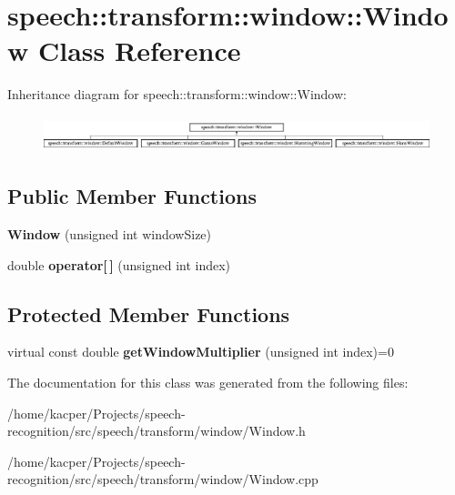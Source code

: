 \hypertarget{classspeech_1_1transform_1_1window_1_1Window}{\section{speech\+:\+:transform\+:\+:window\+:\+:Window Class Reference}
\label{classspeech_1_1transform_1_1window_1_1Window}
}
Inheritance diagram for speech\+:\+:transform\+:\+:window\+:\+:Window\+:\begin{figure}[H]
\begin{center}
\leavevmode
\includegraphics[height=1.040892cm]{classspeech_1_1transform_1_1window_1_1Window}
\end{center}
\end{figure}
\subsection*{Public Member Functions}
\begin{DoxyCompactItemize}
\item 
\hypertarget{classspeech_1_1transform_1_1window_1_1Window_a6c33bea81b0700d6d95d880ec985404a}{{\bfseries Window} (unsigned int window\+Size)}\label{classspeech_1_1transform_1_1window_1_1Window_a6c33bea81b0700d6d95d880ec985404a}

\item 
\hypertarget{classspeech_1_1transform_1_1window_1_1Window_a3e2b01bd3fe3722790b2c7023dfe0417}{double {\bfseries operator\mbox{[}$\,$\mbox{]}} (unsigned int index)}\label{classspeech_1_1transform_1_1window_1_1Window_a3e2b01bd3fe3722790b2c7023dfe0417}

\end{DoxyCompactItemize}
\subsection*{Protected Member Functions}
\begin{DoxyCompactItemize}
\item 
\hypertarget{classspeech_1_1transform_1_1window_1_1Window_acfb3c71e412b7aa1ba076c7f456717dd}{virtual const double {\bfseries get\+Window\+Multiplier} (unsigned int index)=0}\label{classspeech_1_1transform_1_1window_1_1Window_acfb3c71e412b7aa1ba076c7f456717dd}

\end{DoxyCompactItemize}


The documentation for this class was generated from the following files\+:\begin{DoxyCompactItemize}
\item 
/home/kacper/\+Projects/speech-\/recognition/src/speech/transform/window/Window.\+h\item 
/home/kacper/\+Projects/speech-\/recognition/src/speech/transform/window/Window.\+cpp\end{DoxyCompactItemize}
